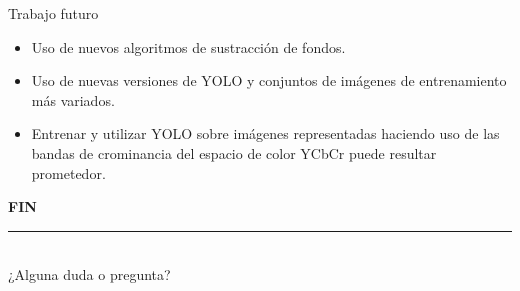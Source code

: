 \documentclass[11pt]{beamer}
\begin{document}
        \begin{frame}{Trabajo futuro}
            \begin{itemize}
                \item Uso de nuevos algoritmos de sustracción de fondos.
                \item Uso de nuevas versiones de YOLO y conjuntos de imágenes de entrenamiento más variados.
                \item Entrenar y utilizar YOLO sobre imágenes representadas haciendo uso de las bandas de crominancia del espacio de color YCbCr puede resultar prometedor.
            \end{itemize}
        \end{frame}
        
        \begin{frame}[standout]
            \textbf{{\Huge FIN}}
            \noindent\rule[-1ex]{\textwidth}{1.5pt}\\[3.5ex]
            ¿Alguna duda o pregunta?
        \end{frame}

    
\end{document}
